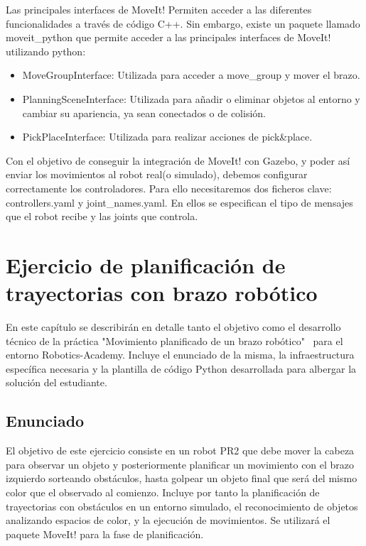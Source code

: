 \documentclass[12pt,spanish,chapterprefix, numbers=noenddot]{book}
\numberwithin{equation}{section}
\numberwithin{figure}{section}
\begin{document}
Las principales interfaces de MoveIt! Permiten acceder a las diferentes funcionalidades a través de código C++. Sin embargo, existe un paquete llamado moveit\_python que permite acceder a las principales interfaces de MoveIt! utilizando python:
\begin{itemize}
\item MoveGroupInterface: Utilizada para acceder a move\_group y mover el brazo. 
\item PlanningSceneInterface: Utilizada para añadir o eliminar objetos al entorno y cambiar su apariencia, ya sean conectados o de colisión. 
\item PickPlaceInterface: Utilizada para realizar acciones de pick\&place.
\end{itemize}

Con el objetivo de conseguir la integración de MoveIt! con Gazebo, y poder así enviar los movimientos al robot real(o simulado), debemos configurar correctamente los controladores. Para ello necesitaremos dos ficheros clave: controllers.yaml y joint\_names.yaml.  En ellos se especifican el tipo de mensajes que el robot recibe y las joints que controla.  

\chapter{Ejercicio de planificación de trayectorias con brazo robótico}
En este capítulo se describirán en detalle tanto el objetivo como el desarrollo técnico de la práctica "Movimiento planificado de un brazo robótico" \ para el entorno Robotics-Academy. 
Incluye el enunciado de la misma, la infraestructura específica necesaria y la plantilla de código Python desarrollada para albergar la solución del estudiante. 

\section{Enunciado}
 El objetivo de este ejercicio consiste en un robot PR2 que debe mover la cabeza para observar un objeto y posteriormente planificar un movimiento con el brazo izquierdo sorteando obstáculos, hasta golpear un objeto final que será del mismo color que el observado al comienzo. Incluye por tanto la planificación de trayectorias con obstáculos en un entorno simulado, el reconocimiento de objetos analizando espacios de color, y la ejecución de movimientos. Se utilizará el paquete MoveIt! para la fase de planificación. 
\end{document}
